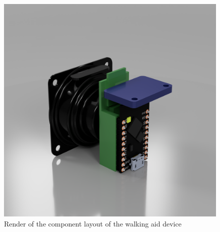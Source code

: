 \begin{figure}[H]
	\centering
	\captionsetup{width=1.0\linewidth}


	\includegraphics[width=0.75\linewidth]{graphics/cad/walkingaid_components_1.png}

	\caption[Walking Aid Components Layout]{Render of the component layout of the walking aid device}

	\label{fig:walkingaid_components_1}

\end{figure}